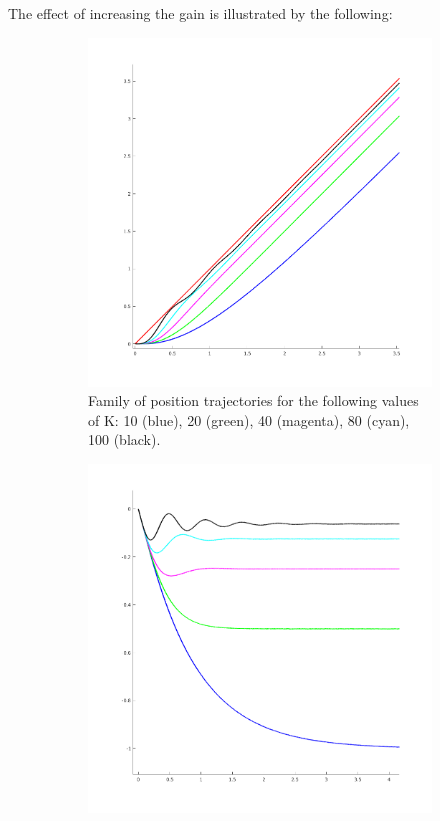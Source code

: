 \documentclass[11pt,a4paper]{article}
\begin{document}
\begin{enumerate}
	The effect of increasing the gain is illustrated by the following:
	
\begin{figure}[h!]
	\centering
	\begin{subfigure}{.5\textwidth}
		\centering
		\includegraphics[width = \textwidth]{imglab/lab4sol_rampposkfam.png}
		\caption{Family of position trajectories for the following values of K: 10 (blue), 20 (green), 40 (magenta), 80 (cyan), 100 (black).}
	\end{subfigure}%
	\begin{subfigure}{.5\textwidth}
		\centering
		\includegraphics[width = \textwidth]{imglab/lab4sol_rampposerr.png}

\end{subfigure}
\end{figure}
\end{enumerate}
\end{document}
